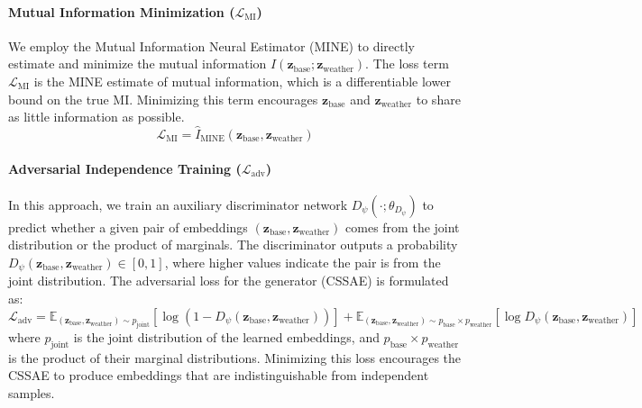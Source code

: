\documentclass[journal]{IEEEtran}
\begin{document}
\paragraph{Mutual Information Minimization ($\mathcal{L}_{\text{MI}}$)}
We employ the Mutual Information Neural Estimator (MINE) \cite{belghazi2018mine} to directly estimate and minimize the mutual information $I(\mathbf{z}_{\text{base}}; \mathbf{z}_{\text{weather}})$. The loss term $\mathcal{L}_{\text{MI}}$ is the MINE estimate of mutual information, which is a differentiable lower bound on the true MI. Minimizing this term encourages $\mathbf{z}_{\text{base}}$ and $\mathbf{z}_{\text{weather}}$ to share as little information as possible.
\begin{equation}
\mathcal{L}_{\text{MI}} = \hat{I}_{\text{MINE}}(\mathbf{z}_{\text{base}}, \mathbf{z}_{\text{weather}})
\end{equation}

\paragraph{Adversarial Independence Training ($\mathcal{L}_{\text{adv}}$)}
In this approach, we train an auxiliary discriminator network $D_\psi(\cdot; \theta_{D_\psi})$ to predict whether a given pair of embeddings $(\mathbf{z}_{\text{base}}, \mathbf{z}_{\text{weather}})$ comes from the joint distribution or the product of marginals. The discriminator outputs a probability $D_\psi(\mathbf{z}_{\text{base}}, \mathbf{z}_{\text{weather}}) \in [0,1]$, where higher values indicate the pair is from the joint distribution. The adversarial loss for the generator (CSSAE) is formulated as:
\begin{equation}
\mathcal{L}_{\text{adv}} = \mathbb{E}_{(\mathbf{z}_{\text{base}}, \mathbf{z}_{\text{weather}}) \sim p_{\text{joint}}} [\log(1 - D_\psi(\mathbf{z}_{\text{base}}, \mathbf{z}_{\text{weather}}))] + \mathbb{E}_{(\mathbf{z}_{\text{base}}, \mathbf{z}_{\text{weather}}) \sim p_{\text{base}} \times p_{\text{weather}}} [\log D_\psi(\mathbf{z}_{\text{base}}, \mathbf{z}_{\text{weather}})]
\end{equation}
where $p_{\text{joint}}$ is the joint distribution of the learned embeddings, and $p_{\text{base}} \times p_{\text{weather}}$ is the product of their marginal distributions. Minimizing this loss encourages the CSSAE to produce embeddings that are indistinguishable from independent samples.
\end{document}

